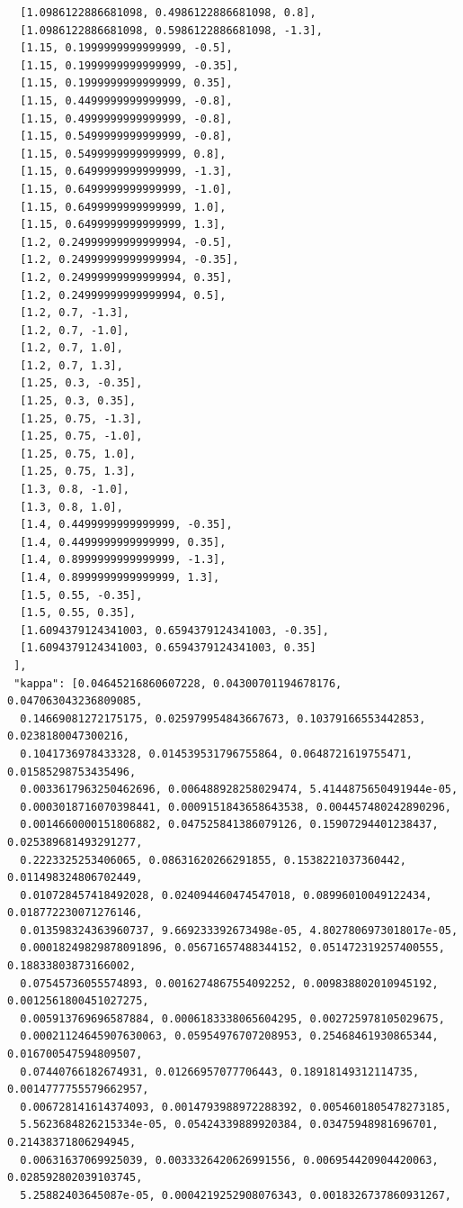\documentclass[11pt,reqno]{amsart}
\numberwithin{equation}{section}
\theoremstyle{definition}
\theoremstyle{remark}
\begin{document}
\begin{lstlisting}
  [1.0986122886681098, 0.4986122886681098, 0.8],
  [1.0986122886681098, 0.5986122886681098, -1.3],
  [1.15, 0.1999999999999999, -0.5],
  [1.15, 0.1999999999999999, -0.35],
  [1.15, 0.1999999999999999, 0.35],
  [1.15, 0.4499999999999999, -0.8],
  [1.15, 0.4999999999999999, -0.8],
  [1.15, 0.5499999999999999, -0.8],
  [1.15, 0.5499999999999999, 0.8],
  [1.15, 0.6499999999999999, -1.3],
  [1.15, 0.6499999999999999, -1.0],
  [1.15, 0.6499999999999999, 1.0],
  [1.15, 0.6499999999999999, 1.3],
  [1.2, 0.24999999999999994, -0.5],
  [1.2, 0.24999999999999994, -0.35],
  [1.2, 0.24999999999999994, 0.35],
  [1.2, 0.24999999999999994, 0.5],
  [1.2, 0.7, -1.3],
  [1.2, 0.7, -1.0],
  [1.2, 0.7, 1.0],
  [1.2, 0.7, 1.3],
  [1.25, 0.3, -0.35],
  [1.25, 0.3, 0.35],
  [1.25, 0.75, -1.3],
  [1.25, 0.75, -1.0],
  [1.25, 0.75, 1.0],
  [1.25, 0.75, 1.3],
  [1.3, 0.8, -1.0],
  [1.3, 0.8, 1.0],
  [1.4, 0.4499999999999999, -0.35],
  [1.4, 0.4499999999999999, 0.35],
  [1.4, 0.8999999999999999, -1.3],
  [1.4, 0.8999999999999999, 1.3],
  [1.5, 0.55, -0.35],
  [1.5, 0.55, 0.35],
  [1.6094379124341003, 0.6594379124341003, -0.35],
  [1.6094379124341003, 0.6594379124341003, 0.35]
 ],
 "kappa": [0.04645216860607228, 0.04300701194678176, 0.047063043236809085,
  0.14669081272175175, 0.025979954843667673, 0.10379166553442853, 0.0238180047300216,
  0.1041736978433328, 0.014539531796755864, 0.0648721619755471, 0.01585298753435496,
  0.0033617963250462696, 0.006488928258029474, 5.4144875650491944e-05,
  0.0003018716070398441, 0.0009151843658643538, 0.004457480242890296,
  0.0014660000151806882, 0.047525841386079126, 0.15907294401238437, 0.025389681493291277,
  0.2223325253406065, 0.08631620266291855, 0.1538221037360442, 0.011498324806702449,
  0.010728457418492028, 0.024094460474547018, 0.08996010049122434, 0.018772230071276146,
  0.013598324363960737, 9.669233392673498e-05, 4.8027806973018017e-05,
  0.00018249829878091896, 0.05671657488344152, 0.051472319257400555, 0.18833803873166002,
  0.07545736055574893, 0.0016274867554092252, 0.009838802010945192, 0.0012561800451027275,
  0.005913769696587884, 0.0006183338065604295, 0.002725978105029675,
  0.00021124645907630063, 0.05954976707208953, 0.25468461930865344, 0.016700547594809507,
  0.07440766182674931, 0.01266957077706443, 0.18918149312114735, 0.0014777755579662957,
  0.006728141614374093, 0.0014793988972288392, 0.0054601805478273185,
  5.5623684826215334e-05, 0.05424339889920384, 0.03475948981696701, 0.21438371806294945,
  0.00631637069925039, 0.0033326420626991556, 0.006954420904420063, 0.028592802039103745,
  5.25882403645087e-05, 0.0004219252908076343, 0.0018326737860931267,

\end{lstlisting}
\end{document}

